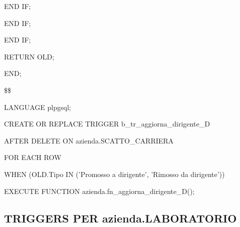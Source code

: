 \begin{flushleft}
\begin{description}
\begin{description}
\begin{description}
\begin{description}
                                \item END IF;
                            \end{description}
                            \item END IF;
                        \end{description}
                        \item END IF;
                        \item RETURN OLD;
                    \end{description}
                    \item END;
                    \item \$\$
                    \item LANGUAGE plpgsql;
                \end{description}
            \end{flushleft}
        \normalfont

        \ttfamily
            \begin{flushleft}
                \begin{description}
                    \item CREATE OR REPLACE TRIGGER b\_tr\_aggiorna\_dirigente\_D
                    \item AFTER DELETE ON azienda.SCATTO\_CARRIERA
                    \item FOR EACH ROW
                    \item WHEN (OLD.Tipo IN ('Promosso a dirigente', 'Rimosso da dirigente')) 
                    \item EXECUTE FUNCTION azienda.fn\_aggiorna\_dirigente\_D();
                \end{description}
            \end{flushleft}
        \normalfont

\newpage

        \subsection{TRIGGERS PER azienda.LABORATORIO}


